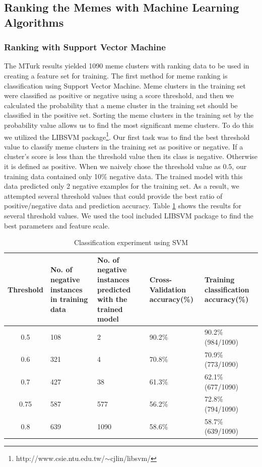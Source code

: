 \documentclass{sig-alternate}
\begin{document}
\subsection{Ranking the Memes with Machine Learning Algorithms}
\subsubsection{Ranking with Support Vector Machine}

The MTurk results yielded 1090 meme clusters with ranking data to be used in creating a feature set for training. The first method for meme ranking is classification using Support Vector Machine. Meme clusters in the training set were classified as positive or negative using a score threshold, and then we calculated the probability that a meme cluster in the training set should be classified in the positive set. Sorting the meme clusters in the training set by the probability value allows us to find the most significant meme clusters. To do this we utilized the LIBSVM package\footnote{http://www.csie.ntu.edu.tw/$\sim$cjlin/libsvm/}. Our first task was to find the best threshold value to classify meme clusters in the training set as positive or negative. If a cluster's score is less than the threshold value then its class is negative. Otherwise it is defined as positive. When we naively chose the threshold value as 0.5, our training data contained only 10\% negative data. The trained model with this data predicted only 2 negative examples for the training set. As a result, we attempted several threshold values that could provide the best ratio of positive/negative data and prediction accuracy. Table \ref{table:svm} shows the results for several threshold values. We used the tool included LIBSVM package to find the best parameters and feature scale.

\begin{table}[t!h]
\begin{center}
\begin{tabular}{c|p{3.5cm}|p{3.5cm}|p{3.5cm}|p{3.5cm}}

Threshold&No. of negative instances in training data&No. of negative instances predicted with the trained model&Cross-Validation accuracy(\%)&Training classification accuracy(\%)\\
\hline
0.5&108&2&90.2\%&90.2\% (984/1090)\\
0.6&321&4&70.8\%&70.9\% (773/1090)\\
0.7&427&38&61.3\%&62.1\% (677/1090)\\
0.75&587&577&56.2\%&72.8\% (794/1090)\\
0.8&639&1090&58.6\%&58.7\% (639/1090)\\
\end{tabular}
\caption{Classification experiment using SVM}
\label{table:svm}
\end{center}
\end{table}
\end{document}
